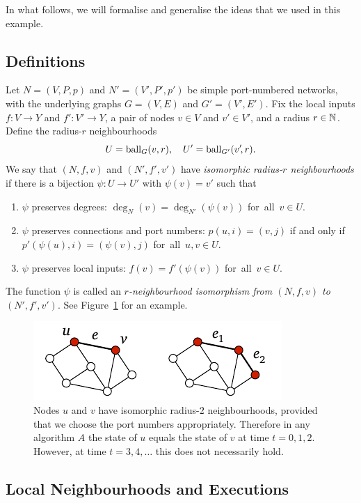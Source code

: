 In what follows, we will formalise and generalise the ideas that we used in this example.

\subsection{Definitions}

Let $N = (V,P,p)$ and $N' = (V'\!,P'\!,p')$ be simple port-numbered networks, with the underlying graphs $G = (V,E)$ and $G' = (V'\!,E')$. Fix the local inputs $f\colon V \to Y$ and $f'\colon V' \to Y$, a pair of nodes $v \in V$ and $v' \in V'$, and a radius $r \in \mathbb{N}$. Define the radius-$r$ neighbourhoods
\[
    U = \operatorname{ball}_G(v,r), \quad U' = \operatorname{ball}_{G'}(v'\!,r).
\]
We say that $(N,f,v)$ and $(N'\!,f'\!,v')$ have \emph{isomorphic radius-$r$ neighbourhoods} if there is a bijection $\psi \colon U \to U'$ with $\psi(v) = v'$ such that
\begin{enumerate}\raggedright
    \item $\psi$ preserves degrees: $\deg_{N}(v) = \deg_{N'}(\psi(v))$ for~all~$v \in U$.
    \item $\psi$ preserves connections and port numbers: $p(u,i) = (v,j)$ if and only if $p'(\psi(u),i) = (\psi(v),j)$ for~all~$u, v \in U$.
    \item $\psi$ preserves local inputs: $f(v) = f'(\psi(v))$ for~all~$v \in U$.
\end{enumerate}
The function $\psi$ is called an \emph{$r$-neighbourhood isomorphism from $(N,f,v)$ to $(N'\!,f'\!,v')$}. See Figure~\ref{fig:same-neigh} for an example.

\begin{figure}
    \centering
    \includegraphics[page=\PSameNeigh]{figs.pdf}
    \caption{Nodes $u$ and $v$ have isomorphic radius-$2$ neighbourhoods, provided that we choose the port numbers appropriately. Therefore in any algorithm $A$ the state of $u$ equals the state of $v$ at time $t = 0,1,2$. However, at time $t = 3, 4, \dotsc$ this does not necessarily hold.}\label{fig:same-neigh}
\end{figure}

\subsection{Local Neighbourhoods and Executions}

